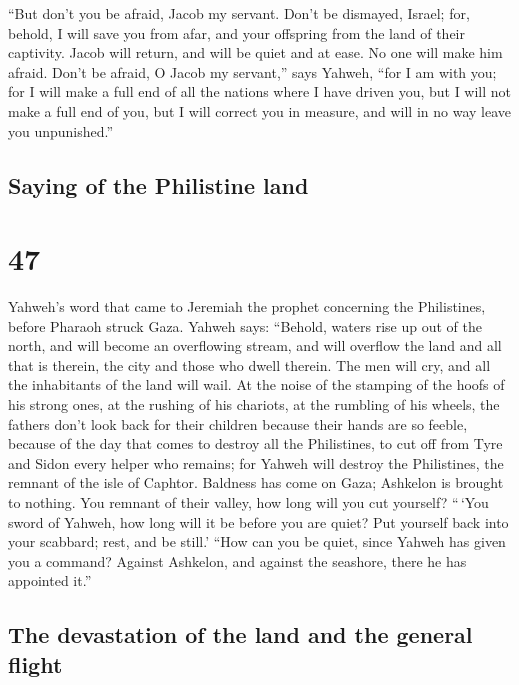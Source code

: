  ``But don't you be afraid, Jacob my servant. Don't be
dismayed, Israel; for, behold, I will save you from afar, and your
offspring from the land of their captivity. Jacob will return, and will
be quiet and at ease. No one will make him afraid.  Don't
be afraid, O Jacob my servant,'' says Yahweh, ``for I am with you; for I
will make a full end of all the nations where I have driven you, but I
will not make a full end of you, but I will correct you in measure, and
will in no way leave you unpunished.''

\hypertarget{saying-of-the-philistine-land}{%
\subsection{Saying of the Philistine
land}\label{saying-of-the-philistine-land}}

\hypertarget{section-46}{%
\section{47}\label{section-46}}

 Yahweh's word that came to Jeremiah the prophet
concerning the Philistines, before Pharaoh struck Gaza. 
Yahweh says: ``Behold, waters rise up out of the north, and will become
an overflowing stream, and will overflow the land and all that is
therein, the city and those who dwell therein. The men will cry, and all
the inhabitants of the land will wail.  At the noise of
the stamping of the hoofs of his strong ones, at the rushing of his
chariots, at the rumbling of his wheels, the fathers don't look back for
their children because their hands are so feeble,  because
of the day that comes to destroy all the Philistines, to cut off from
Tyre and Sidon every helper who remains; for Yahweh will destroy the
Philistines, the remnant of the isle of Caphtor.  Baldness
has come on Gaza; Ashkelon is brought to nothing. You remnant of their
valley, how long will you cut yourself?  ``\,`You sword of
Yahweh, how long will it be before you are quiet? Put yourself back into
your scabbard; rest, and be still.'  ``How can you be
quiet, since Yahweh has given you a command? Against Ashkelon, and
against the seashore, there he has appointed it.''

\hypertarget{the-devastation-of-the-land-and-the-general-flight}{%
\subsection{The devastation of the land and the general
flight}\label{the-devastation-of-the-land-and-the-general-flight}}

